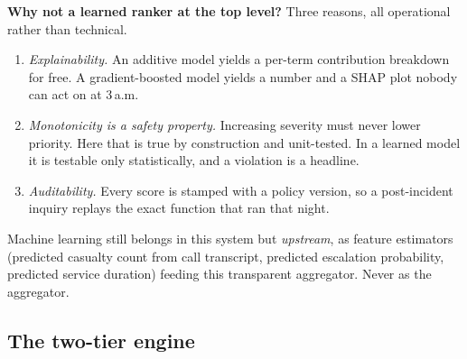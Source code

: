 \begin{keybox}
\textbf{Why not a learned ranker at the top level?} Three reasons, all
operational rather than technical.

\begin{enumerate}
\item \emph{Explainability.} An additive model yields a per-term contribution
      breakdown for free. A gradient-boosted model yields a number and a
      SHAP plot nobody can act on at 3\,a.m.
\item \emph{Monotonicity is a safety property.} Increasing severity must never
      lower priority. Here that is true by construction and unit-tested. In a
      learned model it is testable only statistically, and a violation is a
      headline.
\item \emph{Auditability.} Every score is stamped with a policy version, so a
      post-incident inquiry replays the exact function that ran that night.
\end{enumerate}

Machine learning still belongs in this system \textemdash{} but \emph{upstream},
as feature estimators (predicted casualty count from call transcript,
predicted escalation probability, predicted service duration) feeding this
transparent aggregator. Never as the aggregator.
\end{keybox}

\subsection{The two-tier engine}

\begin{center}
\end{center}

